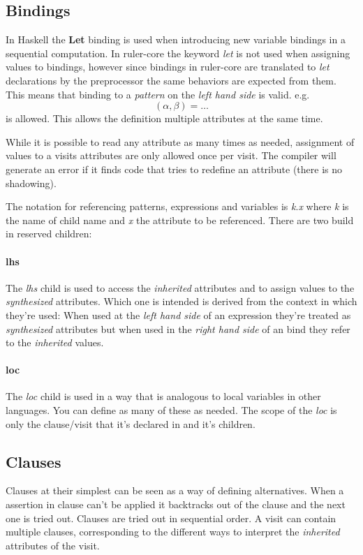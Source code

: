 \subsection{Bindings}
\label{bindings}
In Haskell the \textbf{Let} binding is used when introducing new variable bindings in a sequential computation. In ruler-core the keyword \emph{let} is not used when assigning values to bindings, however since bindings in ruler-core are translated to \emph{let} declarations by the preprocessor the same behaviors are expected from them. This means that binding to a \emph{pattern} on the \emph{left hand side} is valid. e.g. \[ (\alpha, \beta) = \ldots \] is allowed. This allows the definition multiple attributes at the same time.

While it is possible to read any attribute as many times as needed, assignment of values to a visits attributes are only allowed once per visit. The compiler will generate an error if it finds code that tries to redefine an attribute (there is no shadowing).

The notation for referencing patterns, expressions and variables is \emph{k}.\emph{x} where \emph{k} is the name of child name and \emph{x} the attribute to be referenced. There are two build in reserved children:

\paragraph{lhs}
The \emph{lhs} child is used to access the \emph{inherited} attributes and to assign values to the \emph{synthesized} attributes. Which one is intended is derived from the context in which they're used: When used at the \emph{left hand side} of an expression they're treated as \emph{synthesized} attributes but when used in the \emph{right hand side} of an bind they refer to the \emph{inherited} values.
 
\paragraph{loc}
The \emph{loc} child is used in a way that is analogous to local variables in other languages. You can define as many of these as needed. The scope of the \emph{loc} is only the clause/visit that it's declared in and it's children.


\subsection{Clauses}
Clauses at their simplest can be seen as a way of defining alternatives. When a assertion in clause can't be applied it backtracks out of the clause and the next one is tried out. Clauses are tried out in sequential order.
A visit can contain multiple clauses, corresponding to the different ways to interpret the \emph{inherited} attributes of the visit.

